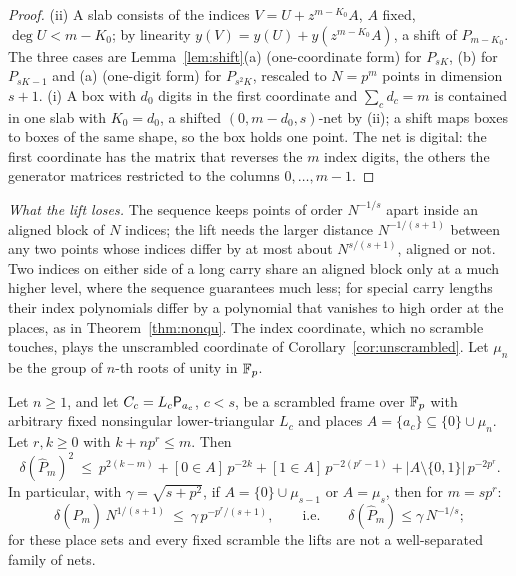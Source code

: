 \begin{proof}
(ii) A slab consists of the indices $V=U+z^{m-K_0}A$, $A$ fixed, $\deg U<m-K_0$; by linearity $y(V)=y(U)+y(z^{m-K_0}A)$, a shift of $P_{m-K_0}$. The three cases are Lemma~\ref{lem:shift}(a) (one-coordinate form) for $P_{sK}$, (b) for $P_{sK-1}$ and (a) (one-digit form) for $P_{s^2K}$, rescaled to $N=p^m$ points in dimension $s+1$. (i) A box with $d_0$ digits in the first coordinate and $\sum_cd_c=m$ is contained in one slab with $K_0=d_0$, a shifted $(0,m-d_0,s)$-net by (ii); a shift maps boxes to boxes of the same shape, so the box holds one point. The net is digital: the first coordinate has the matrix that reverses the $m$ index digits, the others the generator matrices restricted to the columns $0,\dots,m-1$.
\end{proof}

\emph{What the lift loses.} The sequence keeps points of order $N^{-1/s}$ apart inside an aligned block of $N$ indices; the lift needs the larger distance $N^{-1/(s+1)}$ between any two points whose indices differ by at most about $N^{s/(s+1)}$, aligned or not. Two indices on either side of a long carry share an aligned block only at a much higher level, where the sequence guarantees much less; for special carry lengths their index polynomials differ by a polynomial that vanishes to high order at the places, as in Theorem~\ref{thm:nonqu}. The index coordinate, which no scramble touches, plays the unscrambled coordinate of Corollary~\ref{cor:unscrambled}. Let $\mu_n$ be the group of $n$-th roots of unity in $\mathbb{F}_p$.

\begin{proposition}\label{prop:liftcarry}
Let $n\ge1$, and let $C_c=L_c\mathsf{P}_{a_c}$, $c<s$, be a scrambled frame over $\mathbb{F}_p$ with arbitrary fixed nonsingular lower-triangular $L_c$ and places $A=\{a_c\}\subseteq\{0\}\cup\mu_n$. Let $r,k\ge0$ with $k+np^r\le m$. Then
\[
\delta(\hat P_m)^2\ \le\ p^{2(k-m)}+[0\in A]\,p^{-2k}+[1\in A]\,p^{-2(p^r-1)}+|A\setminus\{0,1\}|\,p^{-2p^r}.
\]
In particular, with $\gamma=\sqrt{s+p^2}$, if $A=\{0\}\cup\mu_{s-1}$ or $A=\mu_s$, then for $m=sp^r$:
\[
\delta(\hat P_m)\,N^{1/(s+1)}\ \le\ \gamma\,p^{-p^r/(s+1)},\qquad\text{i.e.}\qquad \delta(\hat P_m)\le\gamma\,N^{-1/s};
\]
for these place sets and every fixed scramble the lifts are not a well-separated family of nets.
\end{proposition}


